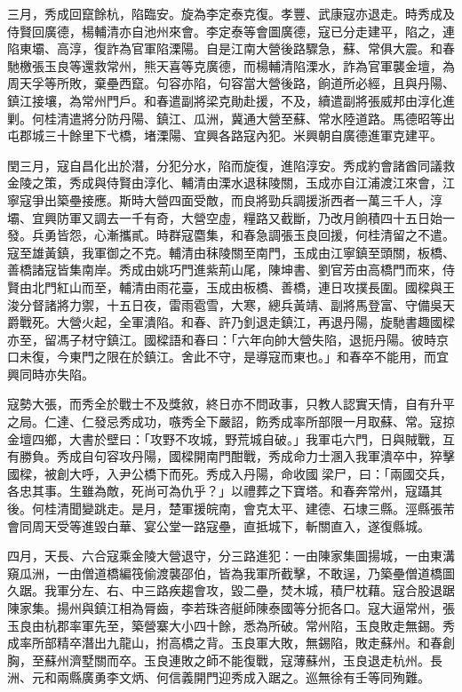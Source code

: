 \begin{pinyinscope}
三月，秀成回竄餘杭，陷臨安。旋為李定泰克復。孝豐、武康寇亦退走。時秀成及侍賢回廣德，楊輔清亦自池州來會。李定泰等會圖廣德，寇已分走建平，陷之，連陷東壩、高淳，復詐為官軍陷溧陽。自是江南大營後路驟急，蘇、常俱大震。和春馳檄張玉良等還救常州，熊天喜等克廣德，而楊輔清陷溧水，詐為官軍襲金壇，為周天孚等所敗，棄壘西竄。句容亦陷，句容當大營後路，餉道所必經，且與丹陽、鎮江接壤，為常州門戶。和春遣副將梁克勛赴援，不及，續遣副將張威邦由淳化進剿。何桂清遣將分防丹陽、鎮江、瓜洲，冀通大營至蘇、常水陸道路。馬德昭等出屯郡城三十餘里下弋橋，堵溧陽、宜興各路寇內犯。米興朝自廣德進軍克建平。

閏三月，寇自昌化出於潛，分犯分水，陷而旋復，進陷淳安。秀成約會諸酋同議救金陵之策，秀成與侍賢由淳化、輔清由溧水退秣陵關，玉成亦自江浦渡江來會，江寧寇爭出築壘接應。斯時大營四面受敵，而良將勁兵調援浙西者一萬三千人，淳壩、宜興防軍又調去一千有奇，大營空虛，糧路又截斷，乃改月餉積四十五日始一發。兵勇皆怨，心漸攜貳。時群寇麕集，和春急調張玉良回援，何桂清留之不遣。寇至雄黃鎮，我軍御之不克。輔清由秣陵關至南門，玉成由江寧鎮至頭關，板橋、善橋諸寇皆集南岸。秀成由姚巧門進紫荊山尾，陳坤書、劉官芳由高橋門而來，侍賢由北門紅山而至，輔清由雨花臺，玉成由板橋、善橋，連日攻撲長圍。國樑與王浚分督諸將力禦，十五日夜，雷雨雹雪，大寒，總兵黃靖、副將馬登富、守備吳天爵戰死。大營火起，全軍潰陷。和春、許乃釗退走鎮江，再退丹陽，旋馳書趣國樑亦至，留馮子材守鎮江。國樑語和春曰：「六年向帥大營失陷，退扼丹陽。彼時京口未復，今東門之限在於鎮江。舍此不守，是導寇而東也。」和春卒不能用，而宜興同時亦失陷。

寇勢大張，而秀全於戰士不及獎敘，終日亦不問政事，只教人認實天情，自有升平之局。仁達、仁發忌秀成功，嗾秀全下嚴詔，飭秀成率所部限一月取蘇、常。寇掠金壇四鄉，大書於壁曰：「攻野不攻城，野荒城自破。」我軍屯六門，日與賊戰，互有勝負。秀成自句容攻丹陽，國樑開南門酣戰，秀成命力士溷入我軍潰卒中，猝擊國樑，被創大呼，入尹公橋下而死。秀成入丹陽，命收國梁尸，曰：「兩國交兵，各忠其事。生雖為敵，死尚可為仇乎？」以禮葬之下寶塔。和春奔常州，寇躡其後。何桂清聞變跳走。是月，楚軍援皖南，會克太平、建德、石埭三縣。涇縣張芾會同周天受等進毀白華、宴公堂一路寇壘，直抵城下，斬關直入，遂復縣城。

四月，天長、六合寇乘金陵大營退守，分三路進犯：一由陳家集圖揚城，一由東溝窺瓜洲，一由僧道橋編筏偷渡襲邵伯，皆為我軍所截擊，不敢逞，乃築壘僧道橋圖久踞。我軍分左、右、中三路疾趨會攻，毀二壘，焚木城，積尸枕藉。寇合股退踞陳家集。揚州與鎮江相為脣齒，李若珠咨艇師陳泰國等分扼各口。寇大逼常州，張玉良由杭郡率軍先至，築營寨大小四十餘，悉為所破。常州陷，玉良敗走無錫。秀成率所部精卒潛出九龍山，拊高橋之背。玉良軍大敗，無錫陷，敗走蘇州。和春創胸，至蘇州濟墅關而卒。玉良連敗之師不能復戰，寇薄蘇州，玉良退走杭州。長洲、元和兩縣廣勇李文炳、何信義開門迎秀成入踞之。巡無徐有壬等同殉難。


\end{pinyinscope}
